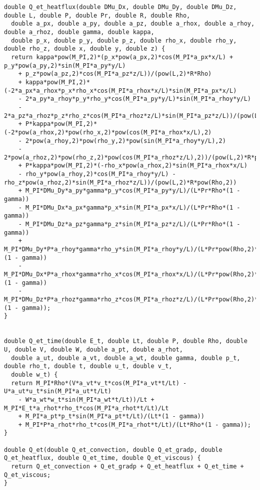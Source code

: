 \documentclass[10pt]{article}
\begin{document}
\begin{footnotesize}
\begin{verbatim}
double Q_et_heatflux(double DMu_Dx, double DMu_Dy, double DMu_Dz, double L, double P, double Pr, double R, double Rho, 
  double a_px, double a_py, double a_pz, double a_rhox, double a_rhoy, double a_rhoz, double gamma, double kappa, 
  double p_x, double p_y, double p_z, double rho_x, double rho_y, double rho_z, double x, double y, double z) {
  return kappa*pow(M_PI,2)*(p_x*pow(a_px,2)*cos(M_PI*a_px*x/L) + p_y*pow(a_py,2)*sin(M_PI*a_py*y/L) 
	+ p_z*pow(a_pz,2)*cos(M_PI*a_pz*z/L))/(pow(L,2)*R*Rho) 
	+ kappa*pow(M_PI,2)*(-2*a_px*a_rhox*p_x*rho_x*cos(M_PI*a_rhox*x/L)*sin(M_PI*a_px*x/L) 
	- 2*a_py*a_rhoy*p_y*rho_y*cos(M_PI*a_py*y/L)*sin(M_PI*a_rhoy*y/L) 
	- 2*a_pz*a_rhoz*p_z*rho_z*cos(M_PI*a_rhoz*z/L)*sin(M_PI*a_pz*z/L))/(pow(L,2)*R*pow(Rho,2)) 
	+ P*kappa*pow(M_PI,2)*(-2*pow(a_rhox,2)*pow(rho_x,2)*pow(cos(M_PI*a_rhox*x/L),2) 
	- 2*pow(a_rhoy,2)*pow(rho_y,2)*pow(sin(M_PI*a_rhoy*y/L),2) 
	- 2*pow(a_rhoz,2)*pow(rho_z,2)*pow(cos(M_PI*a_rhoz*z/L),2))/(pow(L,2)*R*pow(Rho,3)) 
	+ P*kappa*pow(M_PI,2)*(-rho_x*pow(a_rhox,2)*sin(M_PI*a_rhox*x/L) 
	- rho_y*pow(a_rhoy,2)*cos(M_PI*a_rhoy*y/L) - rho_z*pow(a_rhoz,2)*sin(M_PI*a_rhoz*z/L))/(pow(L,2)*R*pow(Rho,2)) 
	+ M_PI*DMu_Dy*a_py*gamma*p_y*cos(M_PI*a_py*y/L)/(L*Pr*Rho*(1 - gamma)) 
	- M_PI*DMu_Dx*a_px*gamma*p_x*sin(M_PI*a_px*x/L)/(L*Pr*Rho*(1 - gamma)) 
	- M_PI*DMu_Dz*a_pz*gamma*p_z*sin(M_PI*a_pz*z/L)/(L*Pr*Rho*(1 - gamma)) 
	+ M_PI*DMu_Dy*P*a_rhoy*gamma*rho_y*sin(M_PI*a_rhoy*y/L)/(L*Pr*pow(Rho,2)*(1 - gamma)) 
	- M_PI*DMu_Dx*P*a_rhox*gamma*rho_x*cos(M_PI*a_rhox*x/L)/(L*Pr*pow(Rho,2)*(1 - gamma)) 
	- M_PI*DMu_Dz*P*a_rhoz*gamma*rho_z*cos(M_PI*a_rhoz*z/L)/(L*Pr*pow(Rho,2)*(1 - gamma));
}


double Q_et_time(double E_t, double Lt, double P, double Rho, double U, double V, double W, double a_pt, double a_rhot, 
  double a_ut, double a_vt, double a_wt, double gamma, double p_t, double rho_t, double t, double u_t, double v_t, 
  double w_t) {
  return M_PI*Rho*(V*a_vt*v_t*cos(M_PI*a_vt*t/Lt) - U*a_ut*u_t*sin(M_PI*a_ut*t/Lt) 
	- W*a_wt*w_t*sin(M_PI*a_wt*t/Lt))/Lt + M_PI*E_t*a_rhot*rho_t*cos(M_PI*a_rhot*t/Lt)/Lt 
	+ M_PI*a_pt*p_t*sin(M_PI*a_pt*t/Lt)/(Lt*(1 - gamma)) 
	+ M_PI*P*a_rhot*rho_t*cos(M_PI*a_rhot*t/Lt)/(Lt*Rho*(1 - gamma));
}

double Q_et(double Q_et_convection, double Q_et_gradp, double Q_et_heatflux, double Q_et_time, double Q_et_viscous) {
  return Q_et_convection + Q_et_gradp + Q_et_heatflux + Q_et_time + Q_et_viscous;
}


\end{verbatim}
\end{footnotesize}
 



\appendix


\end{document}
